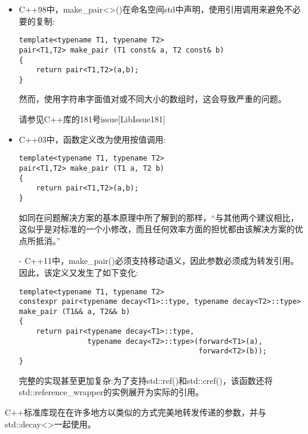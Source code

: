 \begin{itemize}
\item
C++98中，make\_pair<>()在命名空间std中声明，使用引用调用来避免不必要的复制:

\begin{lstlisting}[style=styleCXX]
template<typename T1, typename T2>
pair<T1,T2> make_pair (T1 const& a, T2 const& b)
{
	return pair<T1,T2>(a,b);
}
\end{lstlisting}

然而，使用字符串字面值对或不同大小的数组时，这会导致严重的问题。

\begin{tcolorbox}[colback=webgreen!5!white,colframe=webgreen!75!black]
\hspace*{0.75cm}请参见C++库的181号issue[LibIssue181]
\end{tcolorbox}

\item
C++03中，函数定义改为使用按值调用:

\begin{lstlisting}[style=styleCXX]
template<typename T1, typename T2>
pair<T1,T2> make_pair (T1 a, T2 b)
{
	return pair<T1,T2>(a,b);
}
\end{lstlisting}

如同在问题解决方案的基本原理中所了解到的那样，“与其他两个建议相比，这似乎是对标准的一个小修改，而且任何效率方面的担忧都由该解决方案的优点所抵消。”

\item[-]
C++11中，make\_pair()必须支持移动语义，因此参数必须成为转发引用。因此，该定义又发生了如下变化:

\begin{lstlisting}[style=styleCXX]
template<typename T1, typename T2>
constexpr pair<typename decay<T1>::type, typename decay<T2>::type>
make_pair (T1&& a, T2&& b)
{
	return pair<typename decay<T1>::type,
				typename decay<T2>::type>(forward<T1>(a),
										  forward<T2>(b));
}
\end{lstlisting}

完整的实现甚至更加复杂:为了支持std::ref()和std::cref()，该函数还将std::reference\_wrapper的实例展开为实际的引用。
\end{itemize}

C++标准库现在在许多地方以类似的方式完美地转发传递的参数，并与std::decay<>一起使用。


















